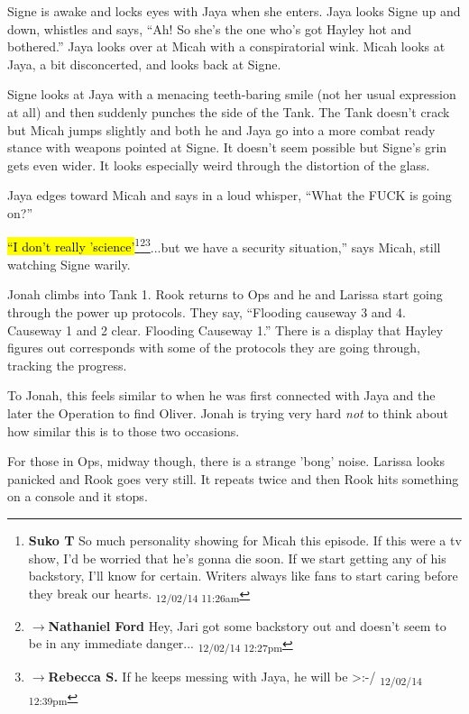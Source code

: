 Signe is awake and locks eyes with Jaya when she enters.  Jaya looks Signe up and down, whistles and says, ``Ah!  So she's the one who's got Hayley hot and bothered.''  Jaya looks over at Micah with a conspiratorial wink.  Micah looks at Jaya, a bit disconcerted, and looks back at Signe.



Signe looks at Jaya with a menacing teeth-baring smile (not her usual expression at all) and then suddenly punches the side of the Tank.  The Tank doesn't crack but Micah jumps slightly and both he and Jaya go into a more combat ready stance with weapons pointed at Signe.  It doesn't seem possible but Signe's grin gets even wider.  It looks especially weird through the distortion of the glass.



Jaya edges toward Micah and says in a loud whisper, ``What the FUCK is going on?''

\hl{``I don't really 'science'}\footnote{\textbf{Suko T }So much personality showing for Micah this episode.  If this were a tv show, I'd be worried that he's gonna die soon.  If we start getting any of his backstory, I'll know for certain.  Writers always like fans to start caring before they break our hearts. \textsubscript{12/02/14 11:26am}}\footnote{$\rightarrow$\textbf{Nathaniel Ford }Hey, Jari got some backstory out and doesn't seem to be in any immediate danger... \textsubscript{12/02/14 12:27pm}}\footnote{$\rightarrow$\textbf{Rebecca S. }If he keeps messing with Jaya, he will be \textgreater :-/ \textsubscript{12/02/14 12:39pm}}...but we have a security situation,'' says Micah, still watching Signe warily.





Jonah climbs into Tank 1.  Rook returns to Ops and he and Larissa start going through the power up protocols.  They say, ``Flooding causeway 3 and 4.  Causeway 1 and 2 clear.  Flooding Causeway 1.'' There is a display that Hayley figures out corresponds with some of the protocols they are going through, tracking the progress.



To Jonah, this feels similar to when he was first connected with Jaya and the later the Operation to find Oliver.  Jonah is trying very hard \textit{not} to think about how similar this is to those two occasions.



For those in Ops, midway though, there is a strange 'bong' noise.  Larissa looks panicked and Rook goes very still.  It repeats twice and then Rook hits something on a console and it stops.




